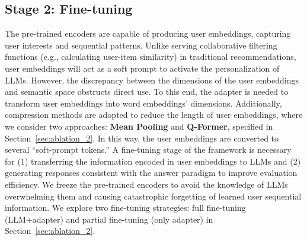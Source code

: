 \subsection{Stage 2: Fine-tuning}
The pre-trained encoders are capable of producing user embeddings, capturing user interests and sequential patterns.
Unlike serving collaborative filtering functions (e.g., calculating user-item similarity) in traditional recommendations, user embeddings will act as a soft prompt to activate the personalization of LLMs. However, the discrepancy between the dimensions of the user embeddings and semantic space obstructs direct use. 
To this end, the adapter is needed to transform user embeddings into word embeddings' dimensions. Additionally, compression methods are adopted to reduce the length of user embeddings, where we consider two approaches: \textbf{Mean Pooling} and \textbf{Q-Former}, specified in Section~\ref{sec:ablation_2}. In this way, the user embeddings are converted to several ``soft-prompt tokens.''
A fine-tuning stage of the framework is necessary for (1) transferring the information encoded in user embeddings to LLMs and (2) generating responses consistent with the answer paradigm to improve evaluation efficiency.
We freeze the pre-trained encoders to avoid the knowledge of LLMs overwhelming them and causing catastrophic forgetting of learned user sequential information.
We explore two fine-tuning strategies: full fine-tuning (LLM+adapter) and partial fine-tuning (only adapter) in Section~\ref{sec:ablation_2}.


